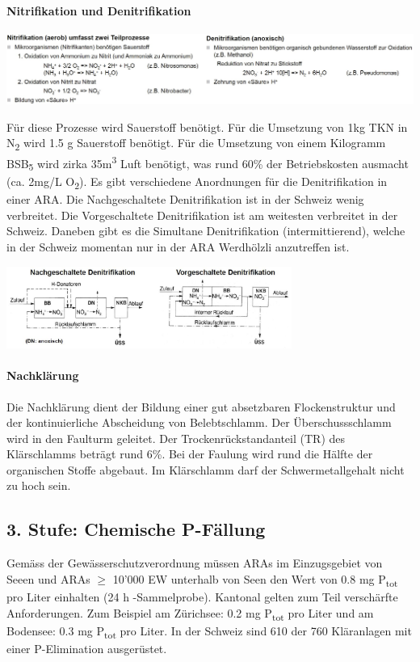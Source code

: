 \documentclass[9pt, openright=false]{scrartcl}
\begin{document}
\paragraph{Nitrifikation und Denitrifikation}
\begin{center}
\includegraphics[width=1.1\textwidth]{images/nitrifikationdenitrifikation}
\end{center}
Für diese Prozesse wird Sauerstoff benötigt. Für die Umsetzung von 1kg TKN in N\textsubscript{2} wird 1.5 g Sauerstoff benötigt. Für die Umsetzung von einem Kilogramm BSB\textsubscript{5} wird zirka 35m\textsuperscript{3} Luft benötigt, was rund 60\% der Betriebskosten ausmacht (ca. 2mg/L O\textsubscript{2}). Es gibt verschiedene Anordnungen für die Denitrifikation in einer ARA. Die Nachgeschaltete Denitrifikation ist in der Schweiz wenig verbreitet. Die Vorgeschaltete Denitrifikation ist am weitesten verbreitet in der Schweiz. Daneben gibt es die Simultane Denitrifikation (intermittierend), welche in der Schweiz momentan nur in der ARA Werdhölzli anzutreffen ist.
\begin{center}
\includegraphics[width=0.7\textwidth]{images/anordnungnitri}
\end{center}
\paragraph{Nachklärung} Die Nachklärung dient der Bildung einer gut absetzbaren Flockenstruktur und der kontinuierliche Abscheidung von Belebtschlamm. Der Überschussschlamm wird in den Faulturm geleitet. Der Trockenrückstandanteil (TR) des Klärschlamms beträgt rund 6\%. Bei der Faulung wird rund die Hälfte der organischen Stoffe abgebaut. Im Klärschlamm darf der Schwermetallgehalt nicht zu hoch sein. 
\subsection{3. Stufe: Chemische P-Fällung} 
Gemäss der Gewässerschutzverordnung müssen ARAs im Einzugsgebiet von Seeen und ARAs $\geq$ 10'000 EW unterhalb von Seen den Wert von 0.8 mg P\textsubscript{tot} pro Liter einhalten (24 h -Sammelprobe). Kantonal gelten zum Teil verschärfte Anforderungen. Zum Beispiel am Zürichsee: 0.2 mg P\textsubscript{tot} pro Liter und am Bodensee: 0.3 mg P\textsubscript{tot} pro Liter. In der Schweiz sind 610 der 760 Kläranlagen mit einer P-Elimination ausgerüstet.
\end{document}
